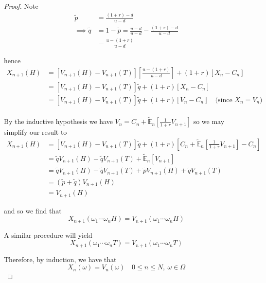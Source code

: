 \documentclass[12pt]{article}
\newlength\tindent
\renewcommand{\indent}{\hspace*{\tindent}}
\newcommand{\E}{\mathbb E}
\begin{document}
\begin{proof}
Note
\begin{align*}
	\tilde{p} &= \frac{(1 + r) - d}{u - d} \\
	\implies \tilde{q} &= 1 - \tilde{p} = \frac{u - d}{u - d} - \frac{(1 + r) - d}{u - d} \\
	&= \frac{u - (1 + r)}{u - d}
\end{align*}
	
hence
\begin{align*}
	X_{n + 1}(H) &= \left[ V_{n + 1}(H) - V_{n + 1}(T) \right] \left[ \frac{u - (1 + r)}{u - d} \right] + (1 + r)\left[X_n - C_n\right] \\
	&= \left[ V_{n + 1}(H) - V_{n + 1}(T) \right]\tilde{q} + (1 + r)\left[X_n - C_n\right] \\
	&= \left[ V_{n + 1}(H) - V_{n + 1}(T) \right]\tilde{q} + (1 + r)\left[V_n - C_n\right] \quad \text{(since } X_n = V_n) \\
\end{align*}

\indent By the inductive hypothesis we have $V_n = C_n + \tilde{\E}_n\left[ \frac{1}{1 + r} V_{n + 1} \right]$ so we may simplify our result to
\begin{align*}
	X_{n + 1}(H) &= \left[ V_{n + 1}(H) - V_{n + 1}(T) \right]\tilde{q} + (1 + r)\left[C_n + \tilde{\E}_n\left[ \frac{1}{1 + r} V_{n + 1} \right] - C_n\right]  \\
	&= \tilde{q}V_{n + 1}(H) - \tilde{q}V_{n + 1}(T) + \tilde{\E}_n \left[ V_{n + 1} \right] \\
	&= \tilde{q}V_{n + 1}(H) - \tilde{q}V_{n + 1}(T) + \tilde{p}V_{n + 1}(H) + \tilde{q}V_{n + 1}(T) \\
	&= (\tilde{p} + \tilde{q})V_{n + 1}(H) \\
	&= V_{n + 1}(H)
\end{align*}

and so we find that
\begin{equation*}
	X_{n + 1}(\omega_1\cdots\omega_n H) = V_{n + 1}(\omega_1\cdots\omega_n H)
\end{equation*}

A similar procedure will yield
\begin{equation*}
	X_{n + 1}(\omega_1\cdots\omega_n T) = V_{n + 1}(\omega_1\cdots\omega_n T)
\end{equation*}

Therefore, by induction, we have that
\begin{equation*}
	X_n(\omega) = V_n(\omega) \quad 0 \leq n \leq N,~ \omega \in \Omega
\end{equation*}
\end{proof}
\end{document}
